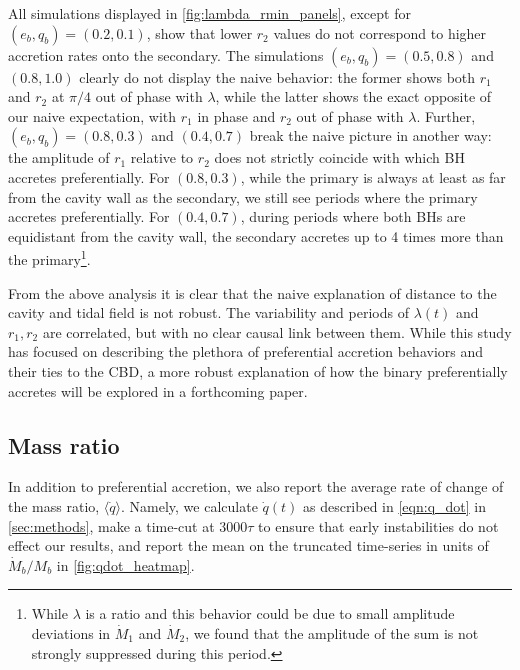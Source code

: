 \documentclass[fleqn,usenatbib]{mnras}
\begin{document}
All simulations displayed in \autoref{fig:lambda_rmin_panels}, except for $(e_b, q_b) = (0.2, 0.1)$, show that lower $r_2$ values do not correspond to higher accretion rates onto the secondary. The simulations $(e_b, q_b) = (0.5, 0.8)$ and $(0.8, 1.0)$ clearly do not display the naive behavior: the former shows both $r_1$ and $r_2$ at $\pi/4$ out of phase with $\lambda$, while the latter shows the exact opposite of our naive expectation, with $r_1$ in phase and $r_2$ out of phase with $\lambda$. Further, $(e_b, q_b) = (0.8, 0.3)$ and $(0.4, 0.7)$ break the naive picture in another way: the amplitude of $r_1$ relative to $r_2$ does not strictly coincide with which BH accretes preferentially. For $(0.8, 0.3)$, while the primary is always at least as far from the cavity wall as the secondary, we still see periods where the primary accretes preferentially. For $(0.4, 0.7)$, during periods where both BHs are equidistant from the cavity wall, the secondary accretes up to 4 times more than the primary\footnote{While $\lambda$ is a ratio and this behavior could be due to small amplitude deviations in $\dot{M}_1$ and $\dot{M}_2$, we found that the amplitude of the sum is not strongly suppressed during this period.}.

From the above analysis it is clear that the naive explanation of distance to the cavity and tidal field is not robust. The variability and periods of $\lambda(t)$ and $r_1, r_2$ are correlated, but with no clear causal link between them. While this study has focused on describing the plethora of preferential accretion behaviors and their ties to the CBD, a more robust explanation of how the binary preferentially accretes will be explored in a forthcoming paper.



\subsection{Mass ratio}\label{sec:mass_ratio}
In addition to preferential accretion, we also report the average rate of change of the mass ratio, $\langle \dot{q} \rangle$. Namely, we calculate $\dot{q}(t)$ as described in \autoref{eqn:q_dot} in \autoref{sec:methods}, make a time-cut at $3000\tau$ to ensure that early instabilities do not effect our results, and report the mean on the truncated time-series in units of $\dot{M}_b/M_b$ in \autoref{fig:qdot_heatmap}.
\end{document}
